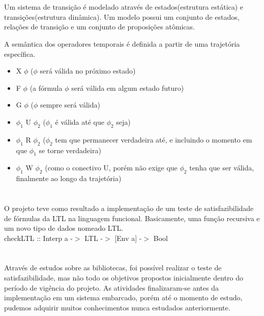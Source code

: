 \documentclass{sciposter}
\newcommand{\tituloA}[1]{\Large{\emph{\textbf{\color{white}{#1}}}}}
\begin{document}
\begin{multicols}{3}
{\section*{\tituloA{Semântica da Lógica Temporal}}

Um sistema de transição é modelado através de estados(estrutura estática) e transições(estrutura dinâmica). Um modelo possui um conjunto de estados, relações de transição e um conjunto de proposições atômicas.
\par A semântica dos operadores temporais é definida a partir de uma trajetória específica.
\begin{itemize}
	\item X $\phi$ ($\phi$ será válida no próximo estado)
	\item F $\phi$ (a fórmula $\phi$ será válida em algum estado futuro)
	\item G $\phi$ ($\phi$ sempre será válida)
	\item $\phi _{1}$ U $\phi _{2}$ ($\phi _{1}$ é válida até que $\phi _{2}$ seja)
	\item $\phi _{1}$ R $\phi _{2}$ ($\phi _{2}$ tem que permanecer verdadeira até, e incluindo o momento em que $\phi _{1}$ se torne verdadeira)
	\item $\phi _{1}$ W $\phi _{2}$ (como o conectivo U, porém não exige que $\phi _{2}$ tenha que ser válida, finalmente ao longo da trajetória) 
\end{itemize}

\section*{\tituloA{Resultados Obtidos}}
O projeto teve como resultado a implementação de um teste de satisfazibilidade de fórmulas da LTL na linguagem funcional. Basicamente, uma função recursiva e um novo tipo de dados nomeado LTL.\\
checkLTL :: Interp a -$>$ LTL -$>$ [Env a] -$>$ Bool	

\section*{\tituloA{Conclusões}}
Através de estudos sobre as bibliotecas, foi possível realizar o teste de satisfazibilidade, mas não todo os objetivos propostos inicialmente dentro do período de vigência do projeto. As atividades finalizaram-se antes da implementação em um sistema embarcado, porém até o momento de estudo, pudemos adquirir muitos conhecimentos nunca estudados anteriormente.

  \section*{\tituloA{Referências}}
  \renewcommand{\section}[2]{}
  
  

  }\end{multicols}
\end{document}

